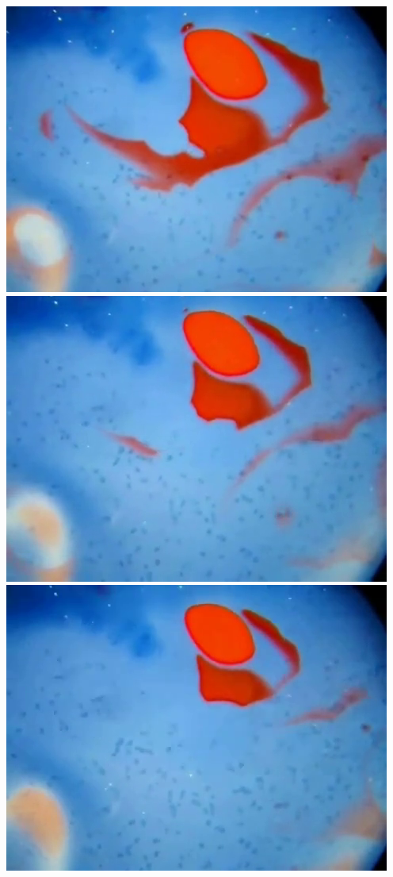 \documentclass[12pt]{report}
\begin{document}
{\includegraphics[scale=0.25]{BZ-frames0012.png}
\includegraphics[scale=0.25]{BZ-frames0013.png}
\includegraphics[scale=0.25]{BZ-frames0014.png}
}
\end{document}
